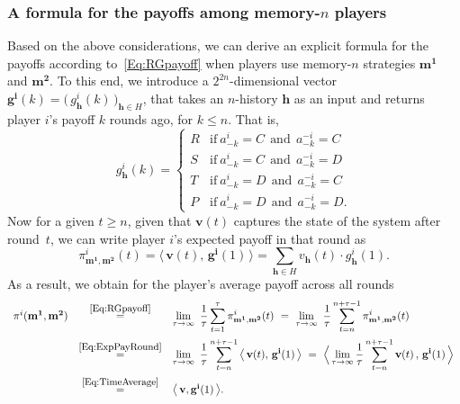 \documentclass[9pt,twoside,lineno]{pnas-new}
\theoremstyle{plainCl1}
\theoremstyle{plainCl2}
\begin{document}
\subsubsection*{A formula for the payoffs among memory-$n$ players} Based on the above considerations, we can derive an explicit formula for the payoffs according to~\eqref{Eq:RGpayoff} when players use memory-$n$ strategies $\mathbf{m^1}$ and $\mathbf{m^2}$. 
To this end, we introduce a $2^{2n}$-dimensional vector $\mathbf{g^i}(k)\!=\!\big(\,g^i_\mathbf{h}(k)\,\big)_{\mathbf{h}\in H}$, that takes an $n$-history $\mathbf{h}$ as an input and returns player $i$'s payoff $k$ rounds ago, for $k\!\le\!n$. 
That is, 
\begin{equation}\label{Eq:g(k)}
    g_\mathbf{h}^i(k) = \left\{
    \begin{array}{cl}
    R	&\text{if}~ a_{-k}^i\!=\!C~~\text{and}~~a_{-k}^{-i}\!=\!C\\[0.1cm]
    S	&\text{if}~ a_{-k}^i\!=\!C~~\text{and}~~ a_{-k}^{-i}\!=\!D\\[0.1cm]
    T	&\text{if}~ a_{-k}^i\!=\!D~~\text{and}~~ a_{-k}^{-i}\!=\!C\\[0.1cm]
    P	&\text{if}~ a_{-k}^i\!=\!D~~\text{and}~~ a_{-k}^{-i}\!=\!D.
    \end{array}
    \right.
\end{equation}
Now for a given $t\!\ge\!n$, given that  $\mathbf{v}(t)$ captures the state of the system after round~$t$, we can write player $i$'s expected payoff in that round as
\begin{equation} \label{Eq:ExpPayRound}
\pi^i_{\mathbf{m^1},\mathbf{m^2}}(t) = \big\langle \,\mathbf{v}(t),\, \mathbf{g^i}(1)\,\big\rangle = \sum_{\mathbf{h}\in H} v_\mathbf{h}(t) \cdot g^i_\mathbf{h}(1). 
\end{equation}
As a result, we obtain for the player's average payoff across all rounds
\begin{equation} \label{Eq:PayoffMemoryn}
\begin{array}{rcl}
\pi^i(\mathbf{m^1},\mathbf{m^2}) 
&\stackrel{\mbox{\small \eqref{Eq:RGpayoff}}}{=}  
&\displaystyle \lim_{\tau \to \infty}~ \frac{1}{\tau} \sum_{t=1}^{\tau} \pi^i_{\mathbf{m^1},\mathbf{m^2}}(t)
~=~
\lim_{\tau \to \infty}~ \frac{1}{\tau} \sum_{t=n}^{n+\tau-1} \pi^i_{\mathbf{m^1},\mathbf{m^2}}(t)\\[0.5cm]
&\stackrel{\mbox{\small \eqref{Eq:ExpPayRound}}}{=}  
&\displaystyle \lim_{\tau \to \infty}~ \frac{1}{\tau} \sum_{t=n}^{n+\tau-1}\big\langle \,\mathbf{v}(t),\, \mathbf{g^i}(1)\,\big\rangle
~=~
\Big\langle \lim_{\tau \to \infty} \frac{1}{\tau} \sum_{t=n}^{n+\tau-1} \mathbf{v}(t)\, , \, \mathbf{g^i}(1)\,\Big\rangle\\[0.5cm]
&\stackrel{\mbox{\small \eqref{Eq:TimeAverage}}}{=}  
&\big\langle\, \mathbf{v}, \mathbf{g^i}(1)\,\big\rangle .
\end{array}
\end{equation}
\end{document}
